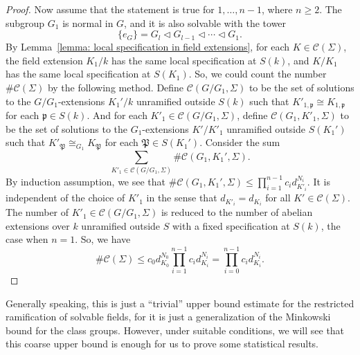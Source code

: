 \documentclass[12pt,a4paper]{amsart}
\numberwithin{equation}{section}%
\theoremstyle{plain}%
\theoremstyle{definition}%
\theoremstyle{remark}%
\begin{document}
\begin{proof}
		Now assume that the statement is true for $1,\dots,n-1$, where $n\geq2$.
		The subgroup $G_1$ is normal in $G$, and it is also solvable with the tower
		\begin{equation*}
			\{e_G\}=G_{l}\triangleleft G_{l-1}\triangleleft\cdots\triangleleft G_1.
		\end{equation*}
		By Lemma~\ref{lemma: local specification in field extensions}, for each $K\in\mathcal{C}(\Sigma)$, the field extension $K_1/k$ has the same local specification at $S(k)$, and $K/K_1$ has the same local specification at $S(K_1)$.
		So, we could count the number $\#\mathcal{C}(\Sigma)$ by the following method.
		Define $\mathcal{C}(G/G_1,\Sigma)$ to be the set of solutions to the $G/G_1$-extensions $K_1'/k$ unramified outside $S(k)$ such that $K'_{1,\mathfrak{p}}\cong K_{1,\mathfrak{p}}$ for each $\mathfrak{p}\in S(k)$.
		And for each $K'_1\in\mathcal{C}(G/G_1,\Sigma)$, define $\mathcal{C}(G_1,K'_1,\Sigma)$ to be the set of solutions to the $G_1$-extensions $K'/K'_1$ unramified outside $S(K_1')$ such that $K'_{\mathfrak{P}}\cong_{G_1} K_{\mathfrak{P}}$ for each $\mathfrak{P}\in S(K_1')$.
		Consider the sum
		\begin{equation*}
			\sum_{K'_1\in\mathcal{C}(G/G_1,\Sigma)}\#\mathcal{C}(G_1,K_1',\Sigma).
		\end{equation*}
		By induction assumption, we see that $\#\mathcal{C}(G_1,K_1',\Sigma)\leq\prod_{i=1}^{n-1}c_id_{K'_i}^{N_i}$. 
		It is independent of the choice of $K'_1$ in the sense that $d_{K'_i}=d_{K_i}$ for all $K'\in\mathcal{C}({\Sigma})$.
		The number of $K'_1\in\mathcal{C}(G/G_1,{\Sigma})$ is reduced to the number of abelian extensions over $k$ unramified outside $S$ with a fixed specification at $S(k)$, the case when $n=1$.
		So, we have
		\begin{equation*}
			\#\mathcal{C}({\Sigma})\leq c_0d_{K_0}^{N_0}\prod_{i=1}^{n-1}c_id_{K_i}^{N_i}=\prod_{i=0}^{n-1}c_id_{K_i}^{N_i}.
		\end{equation*}
	\end{proof}
	Generally speaking, this is just a ``trivial'' upper bound estimate for the restricted ramification of solvable fields, for it is just a generalization of the Minkowski bound for the class groups.
	However, under suitable conditions, we will see that this coarse upper bound is enough for us to prove some statistical results.
	
\end{document}
